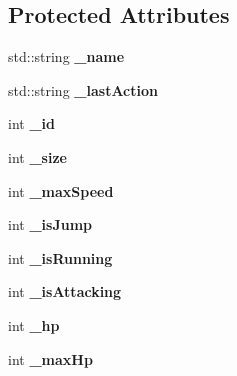 \subsection*{Protected Attributes}
\begin{DoxyCompactItemize}
\item 
\hypertarget{class_characters_aa07da1842926f30143e7504fb6cbeb18}{std\-::string {\bfseries \-\_\-name}}\label{class_characters_aa07da1842926f30143e7504fb6cbeb18}

\item 
\hypertarget{class_characters_a7fd13ae98277d01b16ad744852d5bd9a}{std\-::string {\bfseries \-\_\-last\-Action}}\label{class_characters_a7fd13ae98277d01b16ad744852d5bd9a}

\item 
\hypertarget{class_characters_a1ea81e7d8e2bfb27f9a55b9aa6fbdd2a}{int {\bfseries \-\_\-id}}\label{class_characters_a1ea81e7d8e2bfb27f9a55b9aa6fbdd2a}

\item 
\hypertarget{class_characters_aceee7dd6aae36a7eacefcc276f3423c0}{int {\bfseries \-\_\-size}}\label{class_characters_aceee7dd6aae36a7eacefcc276f3423c0}

\item 
\hypertarget{class_characters_a71736ea7efb50f0174865607d715c8f1}{int {\bfseries \-\_\-max\-Speed}}\label{class_characters_a71736ea7efb50f0174865607d715c8f1}

\item 
\hypertarget{class_characters_a05cdafb4f63caae675982af22c32fba5}{int {\bfseries \-\_\-is\-Jump}}\label{class_characters_a05cdafb4f63caae675982af22c32fba5}

\item 
\hypertarget{class_characters_a9a8242e24955e5a0c75e69598687c55f}{int {\bfseries \-\_\-is\-Running}}\label{class_characters_a9a8242e24955e5a0c75e69598687c55f}

\item 
\hypertarget{class_characters_a19ecafdcd8a707d8b3e0fe3c7069b99e}{int {\bfseries \-\_\-is\-Attacking}}\label{class_characters_a19ecafdcd8a707d8b3e0fe3c7069b99e}

\item 
\hypertarget{class_characters_a08ee77521ac4ceaf02fc663e41251e6d}{int {\bfseries \-\_\-hp}}\label{class_characters_a08ee77521ac4ceaf02fc663e41251e6d}

\item 
\hypertarget{class_characters_abc14e96e35df47aba94dbf23b3dbdba6}{int {\bfseries \-\_\-max\-Hp}}\label{class_characters_abc14e96e35df47aba94dbf23b3dbdba6}


\end{DoxyCompactItemize}
